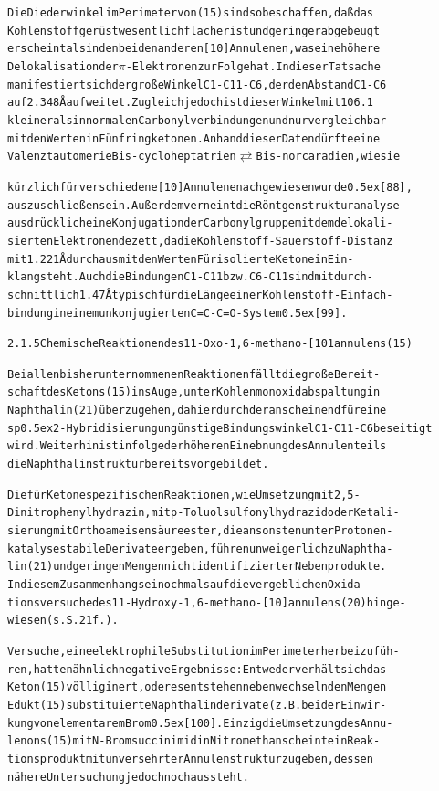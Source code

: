 \documentclass[a4paper,11pt]{article}
\begin{document}
\begin{alltt}
Die Diederwinkel im Perimeter von (15) sind so beschaffen, daß das
Kohlenstoffgerüst wesentlich flacher ist und geringer abgebeugt
erscheint als in den beiden anderen [10]Annulenen, was eine höhere
Delokalisation der \(\pi\)-Elektronen zur Folge hat. In dieser Tatsache
manifestiert sich der große Winkel C1-C11-C6, der den Abstand C1-C6
auf 2.348 {\AA} aufweitet. Zugleich jedoch ist dieser Winkel mit 106.1\degree
kleiner als in normalen Carbonylverbindungen und nur vergleichbar
mit den Werten in Fünfringketonen. Anhand dieser Daten dürfte eine
Valenztautomerie Bis-cycloheptatrien \(\rightleftarrows\) Bis-norcaradien, wie sie

\newpage
{}


kürzlich für verschiedene [10]Annulene nachgewiesen wurde \raise0.5ex\hbox{[88]},
auszuschließen sein. Außerdem verneint die Röntgenstrukturanalyse
ausdrücklich eine Konjugation der Carbonylgruppe mit dem delokali-
sierten Elektronendezett, da die Kohlenstoff-Sauerstoff-Distanz
mit 1.221 {\AA} durchaus mit den Werten Für isolierte Ketone in Ein-
klang steht. Auch die Bindungen C1-C11 bzw. C6-C11 sind mit durch-
schnittlich 1.47 {\AA} typisch für die Länge einer Kohlenstoff-Einfach-
bindung in einem unkonjugierten C=C-C=O - System \raise0.5ex\hbox{[99]}.


2.1.5 Chemische Reaktionen des 11-Oxo-1‚6-methano-[101annulens (15)

Bei allen bisher unternommenen Reaktionen fällt die große Bereit-
schaft des Ketons (15) ins Auge, unter Kohlenmonoxidabspaltung in
Naphthalin (21) überzugehen, da hierdurch der anscheinend für eine
sp\raise0.5ex\hbox{2}-Hybridisierung ungünstige Bindungswinkel C1-C11-C6 beseitigt
wird. Weiterhin ist infolge der höheren Einebnung des Annulenteils
die Naphthalinstruktur bereits vorgebildet.

Die für Ketone spezifischen Reaktionen, wie Umsetzung mit 2,5-
Dinitrophenylhydrazin, mit p-Toluolsulfonylhydrazid oder Ketali-
sierung mit Orthoameisensäureester, die ansonsten unter Protonen-
katalyse stabile Derivate ergeben, führen unweigerlich zu Naphtha-
lin (21) und geringen Mengen nicht identifizierter Nebenprodukte.
In diesem Zusammenhang sei nochmals auf die vergeblichen Oxida-
tionsversuche des 11-Hydroxy-1,6-methano-[10]annulens (20) hinge-
wiesen (s. S. 21 f.).

Versuche, eine elektrophile Substitution im Perimeter herbeizufüh-
ren, hatten ähnlich negative Ergebnisse: Entweder verhält sich das
Keton (15) völlig inert, oder es entstehen neben wechselnden Mengen
Edukt (15) substituierte Naphthalinderivate (z.B. bei der Einwir-
kung von elementarem Brom \raise0.5ex\hbox{[100]}. Einzig die Umsetzung des Annu-
lenons (15) mit N-Bromsuccinimid in Nitromethan scheint ein Reak-
tionsprodukt mit unversehrter Annulenstruktur zu geben, dessen
nähere Untersuchung jedoch noch aussteht.


\end{alltt}
\end{document}
